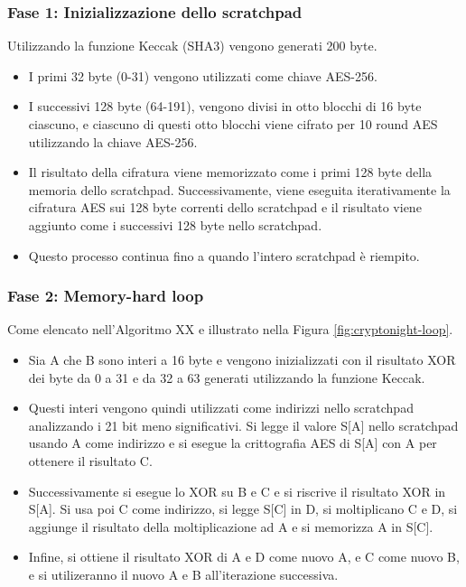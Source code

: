 \subsubsection*{Fase 1: Inizializzazione dello scratchpad}
Utilizzando la funzione Keccak (SHA3) vengono generati 200 byte. 
\begin{itemize}
    \item I primi 32 byte (0-31) vengono utilizzati come chiave AES-256. 
    \item I successivi 128 byte  (64-191), vengono divisi in otto blocchi di 16 byte ciascuno, e ciascuno di questi otto blocchi viene cifrato per 10 round AES utilizzando la chiave AES-256. 
    \item Il risultato della cifratura viene memorizzato come i primi 128 byte della memoria dello scratchpad. Successivamente, viene eseguita iterativamente la cifratura AES sui 128 byte correnti dello scratchpad e il risultato viene aggiunto come i successivi 128 byte nello scratchpad. 
    \item Questo processo continua fino a quando l'intero scratchpad è riempito.
\end{itemize}
    
\subsubsection*{Fase 2: Memory-hard loop}
Come elencato nell'Algoritmo XX e illustrato nella Figura \ref{fig:cryptonight-loop}. 
\begin{itemize}
    \item Sia A che B sono interi a 16 byte e vengono inizializzati con il risultato XOR dei byte da 0 a 31 e da 32 a 63 generati utilizzando la funzione Keccak. 
    \item Questi interi vengono quindi utilizzati come indirizzi nello scratchpad analizzando i 21 bit meno significativi. 
    Si legge il valore S[A] nello scratchpad usando A come indirizzo e si esegue la crittografia AES di S[A] con A per ottenere il risultato C. 
    \item Successivamente si esegue lo XOR su B e C e si riscrive il risultato XOR in S[A]. Si usa poi C come indirizzo, si legge S[C] in D, si moltiplicano C e D, si aggiunge il risultato della moltiplicazione ad A e si memorizza A in S[C].
    \item Infine, si ottiene il risultato XOR di A e D come nuovo A, e C come nuovo B, e si utilizeranno il nuovo A e B all'iterazione successiva. 
\end{itemize}

